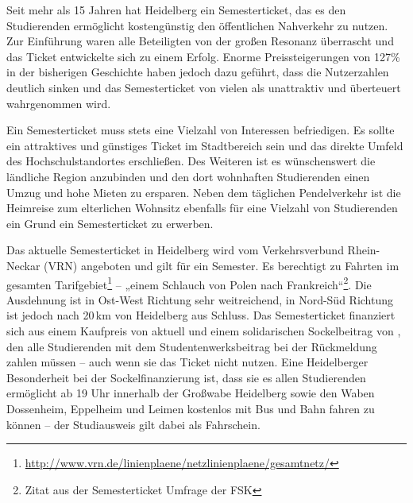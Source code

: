 % 
% 

Seit mehr als 15 Jahren hat Heidelberg ein Semesterticket, das es den
Studierenden ermöglicht kostengünstig den öffentlichen Nahverkehr zu nutzen.
Zur Einführung waren alle Beteiligten von der großen Resonanz überrascht und
das Ticket entwickelte sich zu einem Erfolg.  Enorme Preissteigerungen von
127\% in der bisherigen Geschichte haben jedoch dazu geführt, dass die
Nutzerzahlen deutlich sinken und das Semesterticket von vielen als unattraktiv
und überteuert wahrgenommen wird.

Ein Semesterticket muss stets eine Vielzahl von Interessen befriedigen. Es
sollte ein attraktives und günstiges Ticket im Stadtbereich sein und das
direkte Umfeld des Hochschulstandortes erschließen. Des Weiteren ist es
wünschenswert die ländliche Region anzubinden und den dort wohnhaften
Studierenden einen Umzug und hohe Mieten zu ersparen. Neben dem täglichen
Pendelverkehr ist die Heimreise zum elterlichen Wohnsitz ebenfalls für eine
Vielzahl von Studierenden ein Grund ein Semesterticket zu erwerben.

Das aktuelle Semesterticket in Heidelberg wird vom Verkehrsverbund Rhein-Neckar
(VRN) angeboten und gilt für ein Semester. Es berechtigt zu Fahrten im gesamten
Tarifgebiet\footnote{\url{http://www.vrn.de/linienplaene/netzlinienplaene/gesamtnetz/}}
-- „einem Schlauch von Polen nach Frankreich“\footnote{Zitat aus der
Semesterticket Umfrage der FSK}. Die Ausdehnung ist in Ost-West Richtung sehr
weitreichend, in Nord-Süd Richtung ist jedoch nach 20\,km von Heidelberg aus
Schluss. Das Semesterticket finanziert sich aus einem Kaufpreis von aktuell
\EUR{\semesterticket} und einem solidarischen Sockelbeitrag von
\EUR{\sockelbeitrag}, den alle Studierenden mit dem Studentenwerksbeitrag bei
der Rückmeldung zahlen müssen -- auch wenn sie das Ticket nicht nutzen. Eine
Heidelberger Besonderheit bei der Sockelfinanzierung ist, dass sie es allen
Studierenden ermöglicht ab 19 Uhr innerhalb der Großwabe Heidelberg sowie den
Waben Dossenheim, Eppelheim und Leimen kostenlos mit Bus und Bahn fahren zu
können -- der Studiausweis gilt dabei als Fahrschein.



